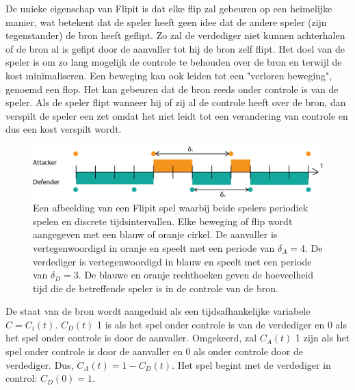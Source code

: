 \documentclass[master=cws, masteroption=vs]{kulemt}
\begin{document}
\begin{abstract*}
De unieke eigenschap van Flipit is dat elke flip zal gebeuren op een heimelijke manier, wat betekent dat de speler heeft geen idee dat de andere speler (zijn tegenstander) de bron heeft geflipt. Zo zal de verdediger niet kunnen achterhalen of de bron al is gefipt door de aanvaller tot hij de bron zelf flipt. Het doel van de speler is om zo lang mogelijk de controle te behouden over de bron en terwijl de kost minimaliseren. Een beweging kan ook leiden tot een "verloren beweging", genoemd een flop. Het kan gebeuren dat de bron reeds onder controle is van de speler. Als de speler flipt wanneer hij of zij al de controle  heeft over de bron, dan verspilt de speler een zet omdat het niet leidt tot een verandering van controle en dus een kost verspilt wordt. \\


\begin{figure}[hbtp]
\center
\includegraphics[scale=0.5]{../../doc/template/Images/DefFlipit}
\caption{Een afbeelding van een Flipit spel waarbij beide spelers periodiek spelen en discrete tijdsintervallen. Elke beweging of flip wordt aangegeven met een blauw of oranje cirkel. De aanvaller is vertegenwoordigd in oranje en speelt met een periode van $ \delta_{A} = 4 $. De verdediger is vertegenwoordigd in blauw en speelt met een periode van $ \delta_{D} = 3 $. De blauwe en oranje rechthoeken geven de hoeveelheid tijd die de betreffende speler is in de controle van de bron.}
\label{fig: FLipItDefault}
\end{figure}



De staat van de bron wordt aangeduid als een tijdsafhankelijke variabele $ C = C_{i}(t) $.
$ C_{D}(t) $ 1 is als het spel onder controle is van de verdediger en 0 als het spel onder controle is door de aanvaller. Omgekeerd, zal $ C_{A}(t) $ 1 zijn als het spel onder controle is door de aanvaller en 0 als onder controle door de verdediger. Dus, $ C_{A}(t) = 1 - C_{D}(t) $.
Het spel begint met de verdediger in control: $ C_{D}(0) = 1 $. \\



\end{abstract*}
\end{document}
